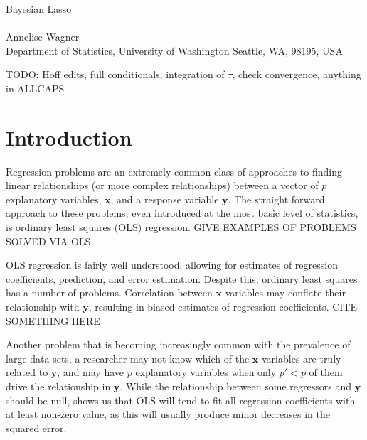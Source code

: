 \documentclass{uwstat572}
\begin{document}

\begin{center}
  {\LARGE Bayesian Lasso}\\\ \\
  {Annelise Wagner \\ 
    Department of Statistics, University of Washington Seattle, WA, 98195, USA
  }
\end{center}

\begin{abstract}
  The Bayesian Lasso, building on the interpretation of Tibshirani, places Laplace priors on linear regression coefficients to allow for Bayesian approaches to parameter and error estimation. An efficient Gibbs sampler allows for quick computation and may be extended to other forms of penalized regression.
\end{abstract}

TODO: Hoff edits, full conditionals, integration of $\tau$, check convergence, anything in ALLCAPS

\section{Introduction}\label{Introduction}
Regression problems are an extremely common class of approaches to finding linear relationships (or more complex relationships) between a vector of $p$ explanatory variables, $\mathbf{x}$, and a response variable $\mathbf{y}$. The straight forward approach to these problems, even introduced at the most basic level of statistics, is ordinary least squares (OLS) regression. GIVE EXAMPLES OF PROBLEMS SOLVED VIA OLS

OLS regression is fairly well understood, allowing for estimates of regression coefficients, prediction, and error estimation. Despite this, ordinary least squares has a number of problems. Correlation between $\mathbf{x}$ variables may conflate their relationship with $\mathbf{y}$, resulting in biased estimates of regression coefficients. CITE SOMETHING HERE

Another problem that is becoming increasingly common with the prevalence of large data sets, a researcher may not know which of the $\mathbf{x}$ variables are truly related to $\mathbf{y}$, and may have $p$ explanatory variables when only $p'<p$ of them drive the relationship in $\mathbf{y}$. While the relationship between some regressors and $\mathbf{y}$ should be null, \cite{seeger2008bayesian} shows us that OLS will tend to fit all regression coefficients with at least non-zero value, as this will usually produce minor decreases in the squared error.
\end{document}
